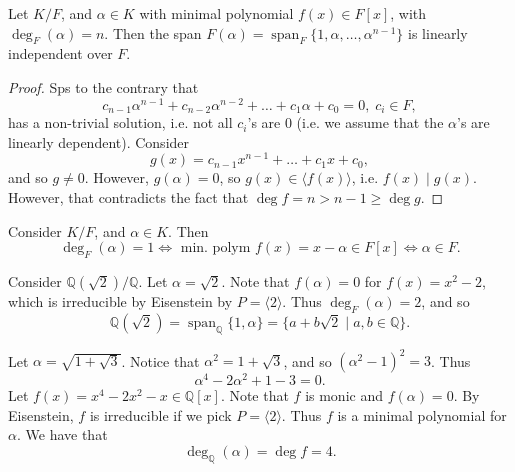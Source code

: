 \documentclass[notoc,notitlepage,nobib]{tufte-book}
\DeclareMathOperator{\Span}{span}
\begin{document}
\begin{propo}\label{propo:span_of_an_extension_if_linearly_independent}
  Let $K / F$, and $\alpha \in K$ with minimal polynomial $f(x) \in F[x]$, with $\deg_F(\alpha) = n$. Then
  the span $F(\alpha) = \Span_F \{ 1, \alpha, \ldots, \alpha^{n - 1} \}$ is linearly independent over $F$.
\end{propo}

\begin{proof}
  Sps to the contrary that
  \begin{equation*}
    c_{n - 1} \alpha^{n - 1} + c_{n - 2} \alpha^{n - 2} + \hdots + c_1 \alpha + c_0 = 0, \; c_i \in F,
  \end{equation*}
  has a non-trivial solution, i.e. not all $c_i$'s are $0$ (i.e. we assume that the $\alpha$'s are linearly
  dependent). Consider
  \begin{equation*}
    g(x) = c_{n - 1} x^{n - 1} + \hdots + c_1 x + c_0,
  \end{equation*}
  and so $g \neq 0$. However, $g(\alpha) = 0$, so $g(x) \in \langle f(x) \rangle$, i.e. $f(x) \mid g(x)$.
  However, that contradicts the fact that $\deg f = n > n - 1 \geq \deg g$.
\end{proof}

\begin{eg}
  Consider $K / F$, and $\alpha \in K$. Then
  \begin{equation*}
    \deg_F(\alpha) = 1 \iff \text{ min. polym } f(x) = x - \alpha \in F[x] \iff \alpha \in F.
  \end{equation*}
\end{eg}

\begin{eg}
  Consider $\mathbb{Q}(\sqrt{2}) / \mathbb{Q}$. Let $\alpha = \sqrt{2}$. Note that $f(\alpha) = 0$ for
  $f(x) = x^2 - 2$, which is irreducible by Eisenstein by $P = \langle 2 \rangle$. Thus 
  $\deg_F(\alpha) = 2$, and so
  \begin{equation*}
    \mathbb{Q}(\sqrt{2}) = \Span_{\mathbb{Q}} \{ 1, \alpha \} = \{ a + b \sqrt{2} \mid a, b \in \mathbb{Q} \}.
  \end{equation*}
\end{eg}

\begin{eg}
  Let $\alpha = \sqrt{1 + \sqrt{3}}$. Notice that $\alpha^2 = 1 + \sqrt{3}$, and so $(\alpha^2 - 1)^2 = 3$.
  Thus
  \begin{equation*}
    \alpha^4 - 2 \alpha^2 + 1 - 3 = 0.
  \end{equation*}
  Let $f(x) = x^4 - 2x^2 - x \in \mathbb{Q}[x]$. Note that $f$ is monic and $f(\alpha) = 0$. By Eisenstein,
  $f$ is irreducible if we pick $P = \langle 2 \rangle$. Thus $f$ is a minimal polynomial for $\alpha$. We
  have that
  \begin{equation*}
    \deg_{\mathbb{Q}}(\alpha) = \deg f = 4.
  \end{equation*}
\end{eg}
\end{document}
